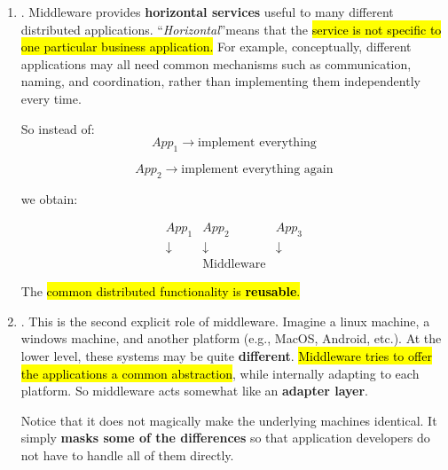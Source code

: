 \begin{enumerate}
    \item {}. Middleware provides \textbf{horizontal services} useful to many different distributed applications. ``\emph{Horizontal}''\break means that the \hl{service is not specific to one particular business application.} For example, conceptually, different applications may all need common mechanisms such as communication, naming, and coordination, rather than implementing them independently every time.

        \highspace
        So instead of:
        \begin{equation*}
            App_1 \rightarrow \text{implement everything}
        \end{equation*}

        \begin{equation*}
            App_2 \rightarrow \text{implement everything again}
        \end{equation*}

        we obtain:

        \begin{equation*}
            \begin{array}{ccc}
                App_1 & App_2 & App_3\\
                \downarrow & \downarrow & \downarrow\\
                &\boxed{\text{Middleware}}&
            \end{array}
        \end{equation*}

        The \hl{common distributed functionality is \textbf{reusable}.}

    \item {}. This is the second explicit role of middleware. Imagine a linux machine, a windows machine, and another platform (e.g., MacOS, Android, etc.). At the lower level, these systems may be quite \textbf{different}. \hl{Middleware tries to offer the applications a common abstraction}, while internally adapting to each platform. So middleware acts somewhat like an \textbf{adapter layer}.

        \highspace
        Notice that it does not magically make the underlying machines identical. It simply \textbf{masks some of the differences} so that application developers do not have to handle all of them directly.
\end{enumerate}

